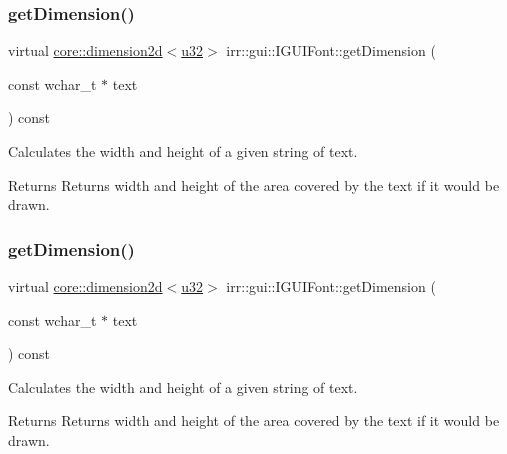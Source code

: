 \subsubsection{\texorpdfstring{get\+Dimension()}{getDimension()}\hspace{0.1cm}{\footnotesize\ttfamily [1/2]}}
{\footnotesize\ttfamily virtual \hyperlink{classirr_1_1core_1_1dimension2d}{core\+::dimension2d}$<$\hyperlink{namespaceirr_a0416a53257075833e7002efd0a18e804}{u32}$>$ irr\+::gui\+::\+I\+G\+U\+I\+Font\+::get\+Dimension (\begin{DoxyParamCaption}\item[{const wchar\+\_\+t $\ast$}]{text }\end{DoxyParamCaption}) const\hspace{0.3cm}{\ttfamily [pure virtual]}}



Calculates the width and height of a given string of text. 

\begin{DoxyReturn}{Returns}
Returns width and height of the area covered by the text if it would be drawn. 
\end{DoxyReturn}
\mbox{\label{classirr_1_1gui_1_1IGUIFont_aa7612db0c9dc2837b44a1a2fa5668797}} 
\subsubsection{\texorpdfstring{get\+Dimension()}{getDimension()}\hspace{0.1cm}{\footnotesize\ttfamily [2/2]}}
{\footnotesize\ttfamily virtual \hyperlink{classirr_1_1core_1_1dimension2d}{core\+::dimension2d}$<$\hyperlink{namespaceirr_a0416a53257075833e7002efd0a18e804}{u32}$>$ irr\+::gui\+::\+I\+G\+U\+I\+Font\+::get\+Dimension (\begin{DoxyParamCaption}\item[{const wchar\+\_\+t $\ast$}]{text }\end{DoxyParamCaption}) const\hspace{0.3cm}{\ttfamily [pure virtual]}}



Calculates the width and height of a given string of text. 

\begin{DoxyReturn}{Returns}
Returns width and height of the area covered by the text if it would be drawn. 
\end{DoxyReturn}
\mbox{\label{classirr_1_1gui_1_1IGUIFont_a7de0b25d3d1dbdcc9036e5d788e2d9ab}} 
